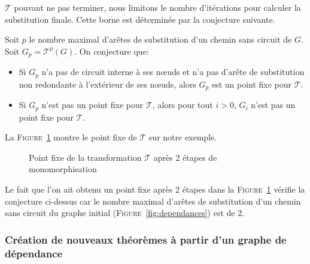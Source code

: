 $\mathcal{T}$ pouvant ne pas terminer, nous limitons le nombre
d'itérations pour calculer la substitution finale. Cette borne est
déterminée par la conjecture suivante.

\begin{conjecture}
Soit $p$ le nombre maximal d'arêtes de substitution d'un chemin sans circuit de $G$. \\Soit $G_p = \mathcal{T}^p(G)$. On conjecture que:
\begin{itemize}
\item Si $G_p$ n'a pas de circuit interne à ses nœuds et n'a pas d'arête de substitution non redondante à l'extérieur de ses nœuds, alors $G_p$ est un point fixe pour $\mathcal{T}$.
\item Si $G_p$ n'est pas un point fixe pour $\mathcal{T}$, alors pour tout $i>0$, $G_i$ n'est pas un point fixe pour $\mathcal{T}$.
\end{itemize}
\end{conjecture}

La \textsc{Figure}~\ref{fig:point_fixe} montre le point fixe de
$\mathcal{T}$ sur notre exemple.
\begin{figure}
\begin{center}
\end{center}
\caption{Point fixe de la transformation $\mathcal{T}$ après 2 étapes de monomorphisation}
\label{fig:point_fixe}
\end{figure}

\begin{remark}
Le fait que l'on ait obtenu un point fixe après 2 étapes dans la
\textsc{Figure}~\ref{fig:point_fixe} vérifie la conjecture ci-dessus car le nombre maximal d'arêtes de substitution d'un chemin sans circuit du graphe initial (\textsc{Figure}~\ref{fig:dependances}) est de 2.
\end{remark}

\subsubsection{Création de nouveaux théorèmes à partir d'un graphe de dépendance}
\label{sec:traduction:nouveautes:conclusion}


